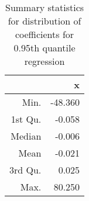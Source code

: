 \begin{table}[ht]
\centering
\begin{tabular}{rr}
  \hline
 & x \\ 
  \hline
Min. & -48.360 \\ 
  1st Qu. & -0.058 \\ 
  Median & -0.006 \\ 
  Mean & -0.021 \\ 
  3rd Qu. & 0.025 \\ 
  Max. & 80.250 \\ 
   \hline
\end{tabular}
\caption{Summary statistics for distribution of coefficients for 0.95th
quantile regression} 
\label{tab:ideology_regressions}
\end{table}
